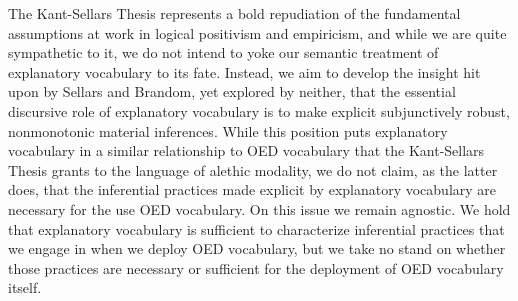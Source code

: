 \documentclass{article}
\begin{document}
The Kant-Sellars Thesis represents a bold repudiation of the fundamental assumptions at work in logical positivism and empiricism, and while we are quite sympathetic to it, we do not intend to yoke our semantic treatment of explanatory vocabulary to its fate. Instead, we aim to develop the insight hit upon by Sellars and Brandom, yet explored by neither, that the essential discursive role of explanatory vocabulary is to make explicit subjunctively robust, nonmonotonic material inferences. While this position puts explanatory vocabulary in a similar relationship to OED vocabulary that the Kant-Sellars Thesis grants to the language of alethic modality, we do not claim, as the latter does, that the inferential practices made explicit by explanatory vocabulary are necessary for the use OED vocabulary. On this issue we remain agnostic. We hold that explanatory vocabulary is sufficient to characterize inferential practices that we engage in when we deploy OED vocabulary, but we take no stand on whether those practices are necessary or sufficient for the deployment of OED vocabulary itself.
\end{document}
